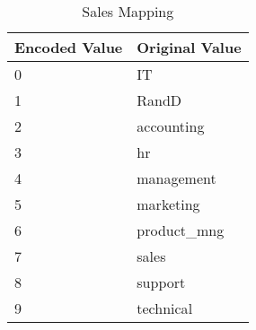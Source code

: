\begin{table}[H]\centering
\caption{Sales Mapping}
\label{tab:sales_mapping}
\begin{tabular}{ll}
\toprule
Encoded Value & Original Value \\
\midrule
0 & IT \\
1 & RandD \\
2 & accounting \\
3 & hr \\
4 & management \\
5 & marketing \\
6 & product\_mng \\
7 & sales \\
8 & support \\
9 & technical \\
\bottomrule
\end{tabular}
\end{table}
